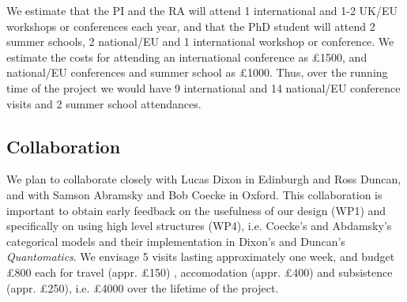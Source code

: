 \documentclass[a4paper]{article}
\begin{document}
{We estimate that the PI and the RA will attend 1 international and 1-2
UK/EU workshops or conferences each year, and that the PhD student
will attend 2 summer schools, 2 national/EU and 1 international
workshop or conference. We estimate the costs for attending an
international conference as \pounds 1500, and national/EU conferences
and summer school as \pounds 1000. Thus, over the running time of
the project we would have 9 international and 14 national/EU
conference visits and 2 summer school attendances.

\subsection*{Collaboration}
\label{sec:collaboration}

We plan to collaborate closely with Lucas Dixon in Edinburgh and Ross
Duncan, and with Samson Abramsky and Bob Coecke in Oxford. This
collaboration is important to obtain early feedback on the usefulness
of our design (WP1) and specifically on using high level structures
(WP4), i.e. Coecke's and Abdamsky's categorical models and their
implementation in Dixon's and Duncan's \emph{Quantomatics}.  We envisage
5 visits lasting approximately one week, and budget \pounds 800 each
for travel (appr. \pounds 150) , accomodation (appr. \pounds 400) and subsistence
(appr. \pounds 250), i.e. \pounds 4000 over the lifetime of the project.





}
\end{document}
